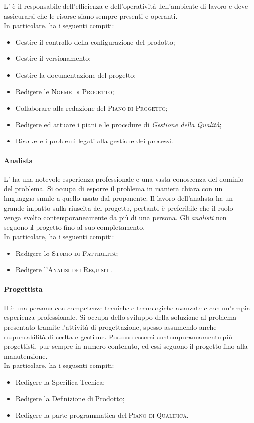 L'\emph{} è il responsabile dell'efficienza e dell'operatività dell'ambiente di lavoro e
deve assicurarsi che le risorse siano sempre presenti e operanti.\\
In particolare, ha i seguenti compiti:
\begin{itemize}
    \item Gestire il controllo della configurazione del prodotto;
    \item Gestire il versionamento;
    \item Gestire la documentazione del progetto;
    \item Redigere le \textsc{Norme di Progetto};
    \item Collaborare alla redazione del \textsc{Piano di Progetto};
    \item Redigere ed attuare i piani e le procedure di \emph{Gestione della Qualità};
    \item Risolvere i problemi legati alla gestione dei processi.
\end{itemize}

\paragraph{Analista}

L'\emph{} ha una notevole esperienza professionale e una vasta conoscenza del dominio del problema.
Si occupa di esporre il problema in maniera chiara con un linguaggio simile a quello usato dal proponente. Il lavoro
dell'analista ha un grande impatto sulla riuscita del progetto, pertanto è preferibile che il ruolo venga svolto
contemporaneamente da più di una persona.
Gli \emph{analisti} non seguono il progetto fino al suo completamento.\\
In particolare, ha i seguenti compiti:
\begin{itemize}
    \item Redigere lo \textsc{Studio di Fattibilità};
    \item Redigere l'\textsc{Analisi dei Requisiti}.
\end{itemize}

\paragraph{Progettista}

Il \emph{} è una persona con competenze tecniche e tecnologiche avanzate e con un'ampia
esperienza professionale. Si occupa dello sviluppo della soluzione al problema presentato tramite l'attività di
progettazione, spesso assumendo anche responsabilità di scelta e gestione. Possono esserci contemporaneamente più
progettisti, pur sempre in numero contenuto, ed essi seguono il progetto fino alla manutenzione.\\
In particolare, ha i seguenti compiti:
\begin{itemize}
    \item Redigere la Specifica Tecnica;
    \item Redigere la Definizione di Prodotto;
    \item Redigere la parte programmatica del \textsc{Piano di Qualifica}.
\end{itemize}

